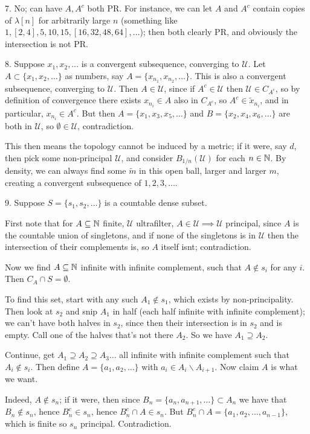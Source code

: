 \documentclass[10pt]{article}
\newcommand{\U}{\mathcal{U}}
\begin{document}
7. No; can have $A,A^c$ both PR. For instance, we can let $A$ and $A^c$ contain copies of $\lambda [n]$ for arbitrarily large $n$ (something like $1,[2,4],5,10,15,[16,32,48,64],\dots$); then both clearly PR, and obviously the intersection is not PR.

8. Suppose $x_1,x_2,\dots$ is a convergent subsequence, converging to $\mathcal{U}$. Let $A\subset \{x_1,x_2,\dots\}$ as numbers, say $A = \{x_{n_1},x_{n_2},\dots\}$. This is also a convergent subsequence, converging to $\mathcal{U}$. Then $A \in \mathcal{U}$, since if $A^c \in \mathcal{U}$ then $\mathcal{U} \in C_{A^c}$, so by definition of convergence there exists $x_{n_i} \in A$ also in $C_{A^c}$, so $A^c \in \tilde{x}_{n_i}$, and in particular, $x_{n_i} \in A^c$. But then $A = \{x_1,x_3,x_5,\dots\}$ and $B = \{x_2,x_4,x_6,\dots\}$ are both in $\mathcal{U}$, so $\emptyset \in \mathcal{U}$, contradiction.

This then means the topology cannot be induced by a metric; if it were, say $d$, then pick some non-principal $\mathcal{U}$, and consider $B_{1/n}(\mathcal{U})$ for each $n \in \mathbb{N}$. By density, we can always find some $\tilde{m}$ in this open ball, larger and larger $m$, creating a convergent subsequence of $1,2,3,\dots$.

9. Suppose $S = \{s_1,s_2,\dots\}$ is a countable dense subset.

First note that for $A\subseteq \mathbb{N}$ finite, $\U$ ultrafilter, $A \in \U \implies \U$ principal, since $A$ is the countable union of singletons, and if none of the singletons is in $\U$ then the intersection of their complements is, so $A$ itself isnt; contradiction.

Now we find $A\subseteq \mathbb{N}$ infinite with infinite complement, such that $A \not\in s_i$ for any $i$. Then $C_A \cap S = \emptyset$.

To find this set, start with any such $A_1 \not\in s_1$, which exists by non-principality. Then look at $s_2$ and snip $A_1$ in half (each half infinite with infinite complement); we can't have both halves in $s_2$, since then their intersection is in $s_2$ and is empty. Call one of the halves that's not there $A_2$. So we have $A_1\supseteq A_2$.

Continue, get $A_1\supseteq A_2\supseteq A_3\dots$ all infinite with infinite complement such that $A_i\not\in s_i$. Then define $A = \{a_1,a_2,\dots\}$ with $a_i \in A_i\backslash A_{i+1}$. Now claim $A$ is what we want.

Indeed, $A \not \in s_n$; if it were, then since $B_n = \{a_n,a_{n+1},\dots\} \subset A_n$ we have that $B_n \not \in s_n$, hence $B_n^c \in s_n$, hence $B_n^c \cap A \in s_n$. But $B_n^c \cap A = \{a_1,a_2,\dots,a_{n-1}\}$, which is finite so $s_n$ principal. Contradiction.
\end{document}
